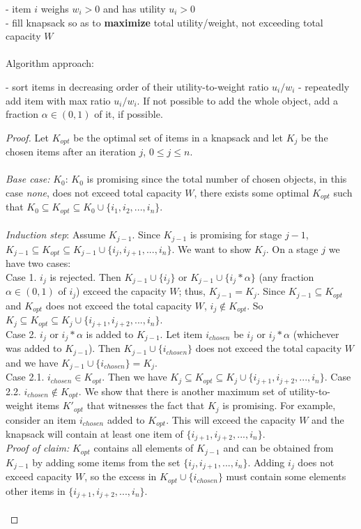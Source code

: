 \documentclass{article}
\newcommand\tab[1][1cm]{\hspace*{#1}}
\begin{document}
- item $i$ weighs $w_i > 0$ and has utility $u_i > 0$\\
- fill knapsack so as to \textbf{maximize} total utility/weight, not exceeding total capacity $W$\\
\\Algorithm approach:
\begin{algorithmic}
\State - sort items in decreasing order of their utility-to-weight ratio $u_i/w_i$
\State - repeatedly add item with max ratio $u_i/w_i$. If not possible to add the whole object, add a fraction $\alpha \in (0, 1)$ of it, if possible.
\end{algorithmic}
\begin{proof}
Let $K_{opt}$ be the optimal set of items in a knapsack and let $K_j$ be the chosen items after an iteration $j$, $0 \leq j \leq n$.\\\\
\textit{Base case:} $K_0$: $K_0$ is promising since the total number of chosen objects, in this case \textit{none}, does not exceed total capacity $W$, there exists some optimal $K_{opt}$ such that $K_0 \subseteq K_{opt} \subseteq K_0 \cup \{ i_1, i_2, ..., i_n\}$.\\
\\
\textit{Induction step}: Assume $K_{j-1}$. Since $K_{j-1}$ is promising for stage $j-1$, $K_{j-1} \subseteq K_{opt} \subseteq K_{j-1} \cup \{i_j, i_{j+1}, ..., i_n \}$. We want to show $K_j$. On a stage $j$ we have two cases:\\
\tab Case 1. $i_j$ is rejected. Then $K_{j-1} \cup \{ i_j \}$ or $K_{j-1} \cup \{ i_j * \alpha \}$  (any fraction $\alpha \in (0, 1)$ of $i_j$) exceed the capacity $W$; thus, $K_{j-1} = K_j$. Since $K_{j-1} \subseteq K_{opt}$ and $K_{opt}$ does not exceed the total capacity $W$, $i_j \notin K_{opt}$. So $K_j \subseteq K_{opt} \subseteq K_j \cup \{ i_{j+1}, i_{j+2}, ..., i_n\}$.\\
\tab Case 2. $i_j$  or $i_j * \alpha$ is added to $K_{j-1}$. Let item $i_{chosen}$ be $i_j$  or $i_j * \alpha$ (whichever was added to $K_{j-1}$). Then $K_{j-1} \cup \{i_{chosen}\}$ does not exceed the total capacity $W$ and we have $K_{j-1} \cup \{i_{chosen}\} = K_j$.\\
\tab Case 2.1. $i_{chosen} \in K_{opt}$. Then we have $K_j \subseteq K_{opt} \subseteq K_j \cup \{ i_{j+1}, i_{j+2}, ..., i_n\}$.
\tab Case 2.2. $i_{chosen} \notin K_{opt}$. We show that there is another maximum set of utility-to-weight items $K'_{opt}$ that witnesses the fact that $K_j$ is promising. For example, consider an item $i_{chosen}$ added to $K_{opt}$. This will exceed the capacity $W$ and the knapsack will contain at least one item of $\{i_{j+1}, i_{j+2}, ..., i_n\}$. \\
\tab \textit{Proof of claim:} $K_{opt}$ contains all elements of $K_{j-1}$ and can be obtained from $K_{j-1}$ by adding some items from the set $\{i_j, i_{j+1}, ..., i_n\}$. Adding $i_j$ does not exceed capacity $W$, so the excess in $K_{opt} \cup \{i_{chosen}\}$ must contain some elements other items in $\{i_{j+1}, i_{j+2}, ..., i_n\}$.\\\\
\end{proof}
\end{document}
